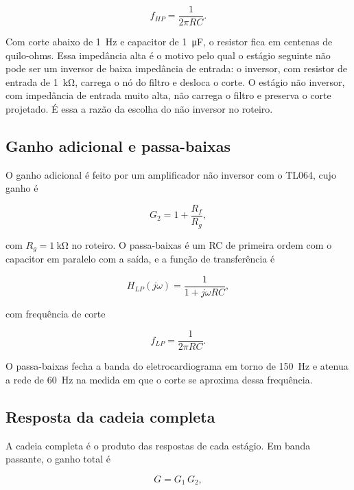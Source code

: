 \documentclass[11pt,a4paper]{article}
\begin{document}
\begin{equation}
f_{HP} = \frac{1}{2\pi R C} .
\label{eq:fhp}
\end{equation}

Com corte abaixo de \SI{1}{\hertz} e capacitor de \SI{1}{\micro\farad}, o resistor fica em centenas de quilo-ohms. Essa impedância alta é o motivo pelo qual o estágio seguinte não pode ser um inversor de baixa impedância de entrada: o inversor, com resistor de entrada de \SI{1}{\kilo\ohm}, carrega o nó do filtro e desloca o corte. O estágio não inversor, com impedância de entrada muito alta, não carrega o filtro e preserva o corte projetado. É essa a razão da escolha do não inversor no roteiro.

\subsection{Ganho adicional e passa-baixas}

O ganho adicional é feito por um amplificador não inversor com o TL064, cujo ganho é

\begin{equation}
G_2 = 1 + \frac{R_f}{R_g} ,
\label{eq:g2}
\end{equation}

com $R_g = \SI{1}{\kilo\ohm}$ no roteiro. O passa-baixas é um RC de primeira ordem com o capacitor em paralelo com a saída, e a função de transferência é

\begin{equation}
H_{LP}(j\omega) = \frac{1}{1 + j\omega R C} ,
\label{eq:lp}
\end{equation}

com frequência de corte

\begin{equation}
f_{LP} = \frac{1}{2\pi R C} .
\label{eq:flp}
\end{equation}

O passa-baixas fecha a banda do eletrocardiograma em torno de \SI{150}{\hertz} e atenua a rede de \SI{60}{\hertz} na medida em que o corte se aproxima dessa frequência.

\subsection{Resposta da cadeia completa}

A cadeia completa é o produto das respostas de cada estágio. Em banda passante, o ganho total é

\begin{equation}
G = G_1 \, G_2 ,
\label{eq:g_total}
\end{equation}
\end{document}
